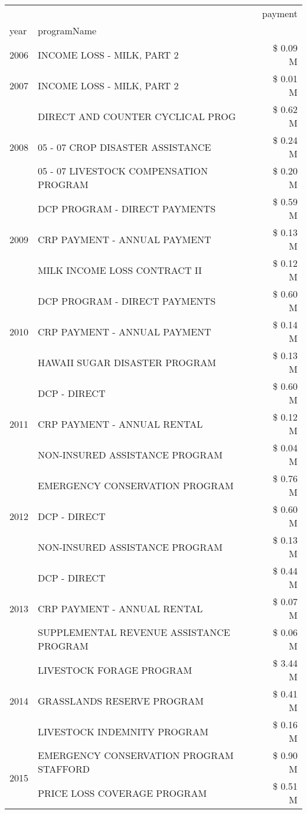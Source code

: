 \begin{tabular}{llr}
\toprule
 &  & payment \\
year & programName &  \\
\midrule
2006 & INCOME LOSS - MILK, PART 2 & \$ 0.09 M \\
\cline{1-3}
2007 & INCOME LOSS - MILK, PART 2 & \$ 0.01 M \\
\cline{1-3}
\multirow[t]{3}{*}{2008} & DIRECT AND COUNTER CYCLICAL PROG & \$ 0.62 M \\
 & 05 - 07 CROP DISASTER ASSISTANCE & \$ 0.24 M \\
 & 05 - 07 LIVESTOCK COMPENSATION PROGRAM & \$ 0.20 M \\
\cline{1-3}
\multirow[t]{3}{*}{2009} & DCP PROGRAM - DIRECT PAYMENTS & \$ 0.59 M \\
 & CRP PAYMENT - ANNUAL PAYMENT & \$ 0.13 M \\
 & MILK INCOME LOSS CONTRACT II & \$ 0.12 M \\
\cline{1-3}
\multirow[t]{3}{*}{2010} & DCP PROGRAM - DIRECT PAYMENTS & \$ 0.60 M \\
 & CRP PAYMENT - ANNUAL PAYMENT & \$ 0.14 M \\
 & HAWAII SUGAR DISASTER PROGRAM & \$ 0.13 M \\
\cline{1-3}
\multirow[t]{3}{*}{2011} & DCP - DIRECT & \$ 0.60 M \\
 & CRP PAYMENT - ANNUAL RENTAL & \$ 0.12 M \\
 & NON-INSURED ASSISTANCE PROGRAM & \$ 0.04 M \\
\cline{1-3}
\multirow[t]{3}{*}{2012} & EMERGENCY CONSERVATION PROGRAM & \$ 0.76 M \\
 & DCP - DIRECT & \$ 0.60 M \\
 & NON-INSURED ASSISTANCE PROGRAM & \$ 0.13 M \\
\cline{1-3}
\multirow[t]{3}{*}{2013} & DCP - DIRECT & \$ 0.44 M \\
 & CRP PAYMENT - ANNUAL RENTAL & \$ 0.07 M \\
 & SUPPLEMENTAL REVENUE ASSISTANCE PROGRAM & \$ 0.06 M \\
\cline{1-3}
\multirow[t]{3}{*}{2014} & LIVESTOCK FORAGE PROGRAM & \$ 3.44 M \\
 & GRASSLANDS RESERVE PROGRAM & \$ 0.41 M \\
 & LIVESTOCK INDEMNITY PROGRAM & \$ 0.16 M \\
\cline{1-3}
\multirow[t]{3}{*}{2015} & EMERGENCY CONSERVATION PROGRAM STAFFORD & \$ 0.90 M \\
 & PRICE LOSS COVERAGE PROGRAM & \$ 0.51 M \\

\end{tabular}
